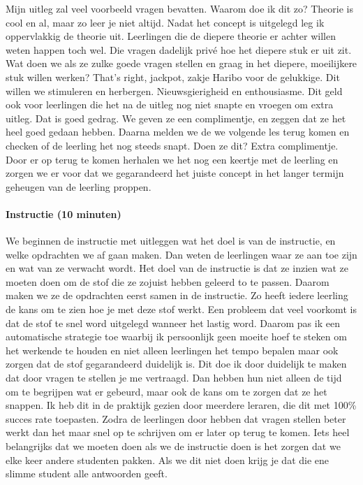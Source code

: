 \documentclass{article}
\begin{document}
                    \bigskip
                    \noindent Mijn uitleg zal veel voorbeeld vragen bevatten. Waarom doe ik dit zo? Theorie is cool en al, maar zo leer je niet altijd. Nadat het concept is uitgelegd leg ik oppervlakkig de theorie uit. Leerlingen die de diepere theorie er achter willen weten happen toch wel. Die vragen dadelijk privé hoe het diepere stuk er uit zit. Wat doen we als ze zulke goede vragen stellen en graag in het diepere, moeilijkere stuk willen werken? That's right, jackpot, zakje Haribo voor de gelukkige. Dit willen we stimuleren en herbergen. Nieuwsgierigheid en enthousiasme. Dit geld ook voor leerlingen die het na de uitleg nog niet snapte en vroegen om extra uitleg. Dat is goed gedrag. We geven ze een complimentje, en zeggen dat ze het heel goed gedaan hebben. Daarna melden we de we volgende les terug komen en checken of de leerling het nog steeds snapt. Doen ze dit? Extra complimentje. Door er op terug te komen herhalen we het nog een keertje met de leerling en zorgen we er voor dat we gegarandeerd het juiste concept in het langer termijn geheugen van de leerling proppen.
                \paragraph{Instructie (10 minuten)}
                    We beginnen de instructie met uitleggen wat het doel is van de instructie, en welke opdrachten we af gaan maken. Dan weten de leerlingen waar ze aan toe zijn en wat van ze verwacht wordt. Het doel van de instructie is dat ze inzien wat ze moeten doen om de stof die ze zojuist hebben geleerd to te passen. Daarom maken we ze de opdrachten eerst samen in de instructie. Zo heeft iedere leerling de kans om te zien hoe je met deze stof werkt.
                    \bigskip
                    \noindent Een probleem dat veel voorkomt is dat de stof te snel word uitgelegd wanneer het lastig word. Daarom pas ik een automatische strategie toe waarbij ik persoonlijk geen moeite hoef te steken om het werkende te houden en niet alleen leerlingen het tempo bepalen maar ook zorgen dat de stof gegarandeerd duidelijk is. Dit doe ik door duidelijk te maken dat door vragen te stellen je me vertraagd. Dan hebben hun niet alleen de tijd om te begrijpen wat er gebeurd, maar ook de kans om te zorgen dat ze het snappen. Ik heb dit in de praktijk gezien door meerdere leraren, die dit met 100\% succes rate toepasten.\cite{succesfull-instructions} Zodra de leerlingen door hebben dat vragen stellen beter werkt dan het maar snel op te schrijven om er later op terug te komen.
                    \bigskip
                    \noindent Iets heel belangrijks dat we moeten doen als we de instructie doen is het zorgen dat we elke keer andere studenten pakken. Als we dit niet doen krijg je dat die ene slimme student alle antwoorden geeft. 
\end{document}
